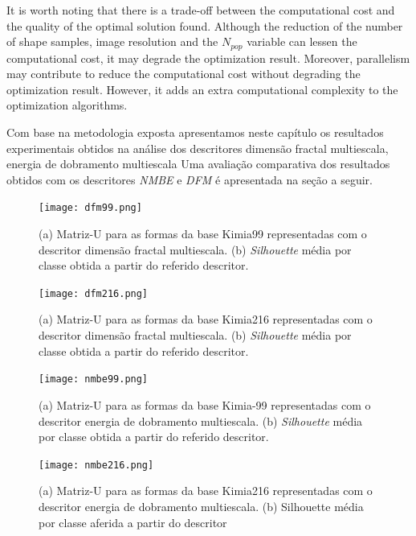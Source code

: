 {It is worth noting that there is a trade-off between the computational cost and the quality of the optimal solution found. Although the reduction of the number of shape samples, image resolution and the $N_{pop}$ variable can lessen the computational cost, it may degrade the optimization result. Moreover, parallelism may contribute to reduce the computational cost without degrading the optimization result.  However, it adds an extra computational complexity to the optimization algorithms.
}





Com base na metodologia exposta apresentamos neste capítulo os resultados experimentais obtidos na análise dos descritores dimensão fractal multiescala, energia de dobramento multiescala Uma avaliação comparativa dos resultados obtidos com os descritores \emph{NMBE} e \emph{DFM} é apresentada na seção a seguir.

\begin{figure}
 \caption{\label{fig:dfm99} (a) Matriz-U para as formas da base Kimia99 representadas com o descritor dimensão fractal multiescala. (b) \textit{Silhouette} média por classe obtida a partir do referido descritor.}
  \centering
  \texttt{[image: dfm99.png]}
\end{figure}

\begin{figure}
 \caption{\label{fig:dfm216} (a) Matriz-U para as formas da base Kimia216 representadas com o descritor dimensão fractal multiescala. (b) \textit{Silhouette} média por classe obtida a partir do referido descritor.}
  \centering
  \texttt{[image: dfm216.png]}
\end{figure}

\begin{figure}
 \caption{\label{fig:nmbe99} (a) Matriz-U para as formas da base Kimia-99 representadas com o descritor energia de dobramento multiescala. (b) \textit{Silhouette }média por classe obtida a partir do referido descritor.}
  \centering
  \texttt{[image: nmbe99.png]}
\end{figure}

\begin{figure}
 \caption{\label{fig:nmbe216} (a) Matriz-U para as formas da base Kimia216 representadas com o descritor energia de dobramento multiescala. (b) Silhouette média por classe aferida a partir do descritor}
  \centering
  \texttt{[image: nmbe216.png]}
\end{figure}


